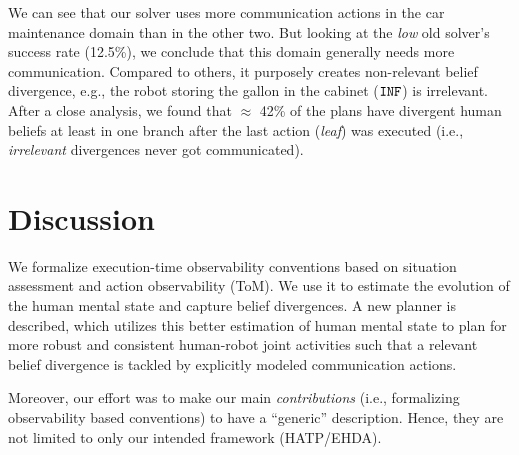 \documentclass[letterpaper]{article} %
\begin{document}

We can see that our solver uses more communication actions in the car maintenance domain than in the other two.
But looking at the \textit{low} old solver's success rate (12.5\%), we conclude that this domain generally needs more communication. 
Compared to others, it purposely creates non-relevant belief divergence, e.g., the robot storing the gallon in the cabinet ($\texttt{INF}$) is irrelevant.
After a close analysis, we found that $\approx$ 42\% of the plans have divergent human beliefs at least in one branch after the last action (\textit{leaf}) was executed (i.e., \textit{irrelevant} divergences never got communicated). 


\section{Discussion}
We formalize execution-time observability conventions based on situation assessment and action observability (ToM). We use it to estimate the evolution of the human mental state and capture belief divergences. 
A new planner is described, which utilizes this better estimation of human mental state to plan for more robust and consistent human-robot joint activities such that a relevant belief divergence is tackled by explicitly modeled communication actions. 

Moreover, our effort was to make our main \textit{contributions} (i.e., formalizing observability based conventions) to have a ``generic'' description. Hence, they are not limited to only our intended framework (HATP/EHDA).
\end{document}
